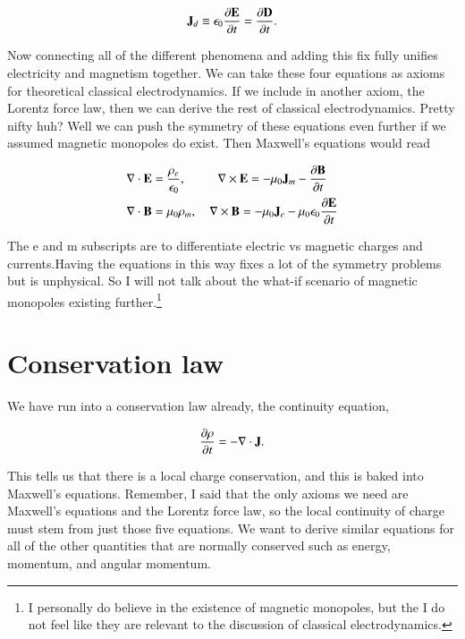\documentclass[preprint, review,12pt]{elsarticle}
\def\x{\times}
\def\.{\cdot}
\def\b{\textbf}
\def\={\equiv}
\def\div{\nabla \.}
\def\curl{\nabla \x}
\newcommand{\pd}[2]{\frac{\partial #1 }{\partial #2}}
\begin{document}
\begin{equation}
    \b J_d \= \epsilon_0 \pd{\b E}{t} = \pd{\b D}{t}.
\end{equation}

Now connecting all of the different phenomena and adding this fix fully unifies electricity and magnetism together. We can take these four equations as axioms for theoretical classical electrodynamics. If we include in another axiom, the Lorentz force law, then we can derive the rest of classical electrodynamics. Pretty nifty huh? Well we can push the symmetry of these equations even further if we assumed magnetic monopoles do exist. Then Maxwell's equations would read

\begin{equation}
\begin{split}
        & \div \b E  = \frac{\rho_e}{\epsilon_0}, \hspace{25.50pt} \curl \b E  = -\mu_0 \b J_m - \pd{\b B}{t} \\
        & \div \b B  = \mu_0 \rho_m, \quad  \curl \b B  = -\mu_0 \b J_e - \mu_0\epsilon_0\pd{\b E}{t}\\
\end{split}
\end{equation}

The e and m subscripts are to differentiate electric vs magnetic charges and currents.Having the equations in this way fixes a lot of the symmetry problems but is unphysical. So I will not talk about the what-if scenario of magnetic monopoles existing further.\footnote{I personally do believe in the existence of magnetic monopoles, but the I do not feel like they are relevant to the discussion of classical electrodynamics.}
    
\section{Conservation law}

We have run into a conservation law already, the continuity equation,

\begin{equation}
     \pd{\rho}{t} = -\div \b J.
\end{equation}

This tells us that there is a local charge conservation, and this is baked into Maxwell's equations. Remember, I said that the only axioms we need are Maxwell's equations and the Lorentz force law, so the local continuity of charge must stem from just those five equations. We want to derive similar equations for all of the other quantities that are normally conserved such as energy, momentum, and angular momentum.
\end{document}
